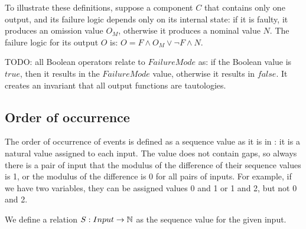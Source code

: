 To illustrate these definitions, suppose a component $C$ that contains only one output, and its failure logic depends only on its internal state: if it is faulty, it produces an omission value $O_M$, otherwise it produces a nominal value $N$. 
%
The failure logic for its output $O$ is: $O = F \land O_M \lor \lnot F \land N$.

TODO: all Boolean operators relate to $FailureMode$ as: if the Boolean value is $true$, then it results in the $FailureMode$ value, otherwise it results in $false$. It creates an invariant that all output functions are tautologies.

\subsection{Order of occurrence}

The order of occurrence of events is defined as a sequence value as it is in \HIPHOPS: it is a natural value assigned to each input.
%
The value does not contain gaps, so always there is a pair of input that the modulus of the difference of their sequence values is 1, or the modulus of the difference is 0 for all pairs of inputs.
%
For example, if we have two variables, they can be assigned values 0 and 1 or 1 and 2, but not 0 and 2. 

We define a relation $S : Input \rightarrow \mathbb{N} $ as the sequence value for the given input.

